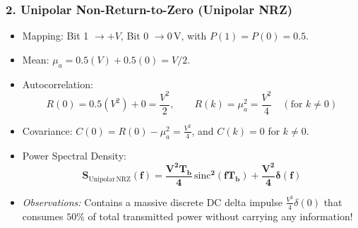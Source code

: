 \documentclass[11pt,a4paper]{article}
\begin{document}
\subsubsection{2. Unipolar Non-Return-to-Zero (Unipolar NRZ)}
\begin{itemize}
    \item Mapping: Bit 1 $\to +V$, Bit 0 $\to 0\,\mathrm{V}$, with $P(1) = P(0) = 0.5$.
    \item Mean: $\mu_a = 0.5(V) + 0.5(0) = V / 2$.
    \item Autocorrelation:
    \begin{equation}
    R(0) = 0.5(V^2) + 0 = \frac{V^2}{2}, \qquad R(k) = \mu_a^2 = \frac{V^2}{4} \quad (\text{for } k \ne 0)
    \end{equation}
    \item Covariance: $C(0) = R(0) - \mu_a^2 = \frac{V^2}{4}$, and $C(k) = 0$ for $k \ne 0$.
    \item Power Spectral Density:
    \begin{equation}
    \mathbf{S_{\mathrm{Unipolar\,NRZ}}(f) = \frac{V^2 T_b}{4} \,\mathrm{sinc}^2(f T_b) + \frac{V^2}{4} \delta(f)}
    \end{equation}
    \item \textit{Observations:} Contains a massive discrete DC delta impulse $\frac{V^2}{4} \delta(0)$ that consumes $50\%$ of total transmitted power without carrying any information!
\end{itemize}
\end{document}
